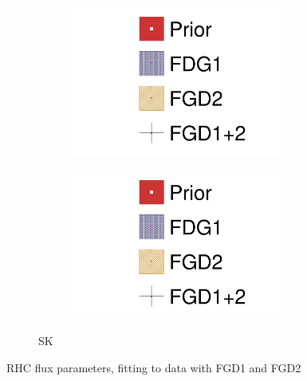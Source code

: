 \begin{figure}[h]
\begin{subfigure}[t]{\textwidth}
\begin{subfigure}[t]{0.24\textwidth}
			\includegraphics[width=\textwidth,page=16, trim={0mm 0mm 0mm 9mm}, clip]{figures/mach3/2018/data/2018a_FixedCov_RedCov_Mpi_FGD1Only_Data_merge_2018a_FixedCov_RedCov_Mpi_FGD2Only_Data_merge_2018a_FixedCov_RedCov_Mpi_Data_merge}
		\end{subfigure}
		\begin{subfigure}[t]{0.24\textwidth}
			\includegraphics[width=\textwidth,page=17, trim={0mm 0mm 0mm 9mm}, clip]{figures/mach3/2018/data/2018a_FixedCov_RedCov_Mpi_FGD1Only_Data_merge_2018a_FixedCov_RedCov_Mpi_FGD2Only_Data_merge_2018a_FixedCov_RedCov_Mpi_Data_merge}
		\end{subfigure}
		\caption{SK}
	\end{subfigure}
	\caption{RHC flux parameters, fitting to data with FGD1 and FGD2}
	\label{fig:data_fdg1vsfgd2_2018_rhc}
\end{figure}

